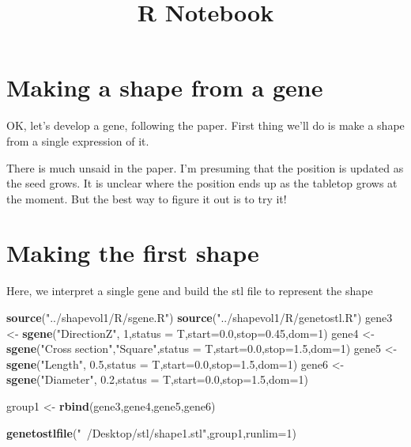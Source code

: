\documentclass[]{article}
\title{R Notebook}
\author{}
\date{}
\newenvironment{Shaded}{\begin{snugshade}}{\end{snugshade}}
\newcommand{\DataTypeTok}[1]{\textcolor[rgb]{0.13,0.29,0.53}{#1}}
\newcommand{\DecValTok}[1]{\textcolor[rgb]{0.00,0.00,0.81}{#1}}
\newcommand{\FloatTok}[1]{\textcolor[rgb]{0.00,0.00,0.81}{#1}}
\newcommand{\KeywordTok}[1]{\textcolor[rgb]{0.13,0.29,0.53}{\textbf{#1}}}
\newcommand{\NormalTok}[1]{#1}
\newcommand{\StringTok}[1]{\textcolor[rgb]{0.31,0.60,0.02}{#1}}
\begin{document}
\maketitle

\hypertarget{making-a-shape-from-a-gene}{%
\section{Making a shape from a gene}\label{making-a-shape-from-a-gene}}

OK, let's develop a gene, following the paper. First thing we'll do is
make a shape from a single expression of it.

There is much unsaid in the paper. I'm presuming that the position is
updated as the seed grows. It is unclear where the position ends up as
the tabletop grows at the moment. But the best way to figure it out is
to try it!

\hypertarget{making-the-first-shape}{%
\section{Making the first shape}\label{making-the-first-shape}}

Here, we interpret a single gene and build the stl file to represent the
shape

\begin{Shaded}
\begin{Highlighting}[]
\KeywordTok{source}\NormalTok{(}\StringTok{"../shapevol1/R/sgene.R"}\NormalTok{)}
\KeywordTok{source}\NormalTok{(}\StringTok{"../shapevol1/R/genetostl.R"}\NormalTok{)}
\NormalTok{gene3 <-}\StringTok{ }\KeywordTok{sgene}\NormalTok{(}\StringTok{"DirectionZ"}\NormalTok{,          }\DecValTok{1}\NormalTok{,}\DataTypeTok{status =}\NormalTok{ T,}\DataTypeTok{start=}\FloatTok{0.0}\NormalTok{,}\DataTypeTok{stop=}\FloatTok{0.45}\NormalTok{,}\DataTypeTok{dom=}\DecValTok{1}\NormalTok{)}
\NormalTok{gene4 <-}\StringTok{ }\KeywordTok{sgene}\NormalTok{(}\StringTok{"Cross section"}\NormalTok{,}\StringTok{"Square"}\NormalTok{,}\DataTypeTok{status =}\NormalTok{ T,}\DataTypeTok{start=}\FloatTok{0.0}\NormalTok{,}\DataTypeTok{stop=}\FloatTok{1.5}\NormalTok{,}\DataTypeTok{dom=}\DecValTok{1}\NormalTok{)}
\NormalTok{gene5 <-}\StringTok{ }\KeywordTok{sgene}\NormalTok{(}\StringTok{"Length"}\NormalTok{,            }\FloatTok{0.5}\NormalTok{,}\DataTypeTok{status =}\NormalTok{ T,}\DataTypeTok{start=}\FloatTok{0.0}\NormalTok{,}\DataTypeTok{stop=}\FloatTok{1.5}\NormalTok{,}\DataTypeTok{dom=}\DecValTok{1}\NormalTok{)}
\NormalTok{gene6 <-}\StringTok{ }\KeywordTok{sgene}\NormalTok{(}\StringTok{"Diameter"}\NormalTok{,          }\FloatTok{0.2}\NormalTok{,}\DataTypeTok{status =}\NormalTok{ T,}\DataTypeTok{start=}\FloatTok{0.0}\NormalTok{,}\DataTypeTok{stop=}\FloatTok{1.5}\NormalTok{,}\DataTypeTok{dom=}\DecValTok{1}\NormalTok{)}

\NormalTok{group1 <-}\StringTok{ }\KeywordTok{rbind}\NormalTok{(gene3,gene4,gene5,gene6)}

\KeywordTok{genetostlfile}\NormalTok{(}\StringTok{"~/Desktop/stl/shape1.stl"}\NormalTok{,group1,}\DataTypeTok{runlim=}\DecValTok{1}\NormalTok{)}
\end{Highlighting}
\end{Shaded}
\end{document}
